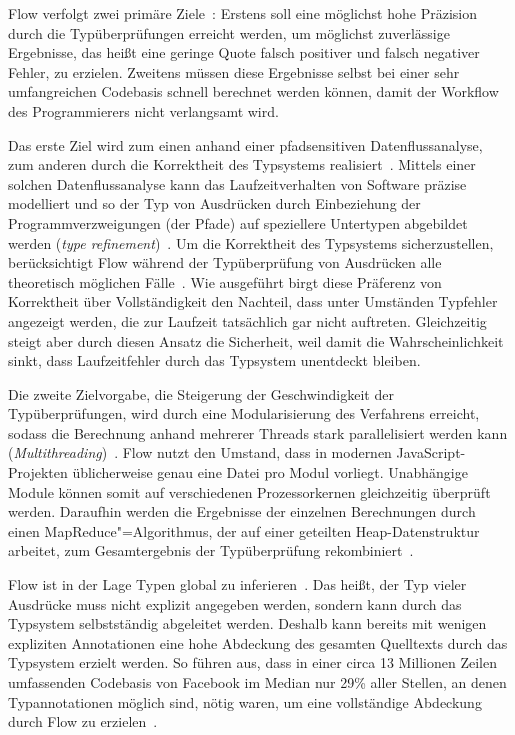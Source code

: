 Flow verfolgt zwei primäre Ziele~\autocite{FLOW:TYPE_SYSTEM}: Erstens soll eine möglichst hohe Präzision durch die Typüberprüfungen erreicht werden, um möglichst zuverlässige Ergebnisse, das heißt eine geringe Quote falsch positiver und falsch negativer Fehler, zu erzielen. Zweitens müssen diese Ergebnisse selbst bei einer sehr umfangreichen Codebasis schnell berechnet werden können, damit der Workflow des Programmierers nicht verlangsamt wird.

Das erste Ziel wird zum einen anhand einer pfadsensitiven Datenflussanalyse, zum anderen durch die Korrektheit des Typsystems realisiert~\autocite{FLOW:TYPE_SYSTEM}. Mittels einer solchen Datenflussanalyse kann das Laufzeitverhalten von Software präzise modelliert und so der Typ von Ausdrücken durch Einbeziehung der Programmverzweigungen (der Pfade) auf speziellere Untertypen abgebildet werden (\textit{type refinement})~\cites{WINTER:2013}[2]{FLOW:PAPER}.
Um die Korrektheit des Typsystems sicherzustellen, berücksichtigt Flow während der Typüberprüfung von Ausdrücken alle theoretisch möglichen Fälle~\autocite{FLOW:TYPES_AND_EXPRESSIONS}. Wie ausgeführt birgt diese Präferenz von Korrektheit über Vollständigkeit den Nachteil, dass unter Umständen Typfehler angezeigt werden, die zur Laufzeit tatsächlich gar nicht auftreten. Gleichzeitig steigt aber durch diesen Ansatz die Sicherheit, weil damit die Wahrscheinlichkeit sinkt, dass Laufzeitfehler durch das Typsystem unentdeckt bleiben.

Die zweite Zielvorgabe, die Steigerung der Geschwindigkeit der Typüberprüfungen, wird durch eine Modularisierung des Verfahrens erreicht, sodass die Berechnung anhand mehrerer Threads stark parallelisiert werden kann (\textit{Multithreading})~\autocite[4]{FLOW:PAPER}. Flow nutzt den Umstand, dass in modernen JavaScript-Projekten üblicherweise genau eine Datei pro Modul vorliegt. Unabhängige Module können somit auf verschiedenen Prozessorkernen gleichzeitig überprüft werden. Daraufhin werden die Ergebnisse der einzelnen Berechnungen durch einen MapReduce"=Algorithmus, der auf einer geteilten Heap-Datenstruktur arbeitet, zum Gesamtergebnis der Typüberprüfung rekombiniert~\autocite[22\psq]{FLOW:PAPER}.

Flow ist in der Lage Typen global zu inferieren~\autocite[25]{FLOW:PAPER}. Das heißt, der Typ vieler Ausdrücke muss nicht explizit angegeben werden, sondern kann durch das Typsystem selbstständig abgeleitet werden. Deshalb kann bereits mit wenigen expliziten Annotationen eine hohe Abdeckung des gesamten Quelltexts durch das Typsystem erzielt werden. So führen \citeauthor{FLOW:PAPER} aus, dass in einer circa 13 Millionen Zeilen umfassenden Codebasis von Facebook im Median nur 29\% aller Stellen, an denen Typannotationen möglich sind, nötig waren, um eine vollständige Abdeckung durch Flow zu erzielen~\autocite[24]{FLOW:PAPER}.

